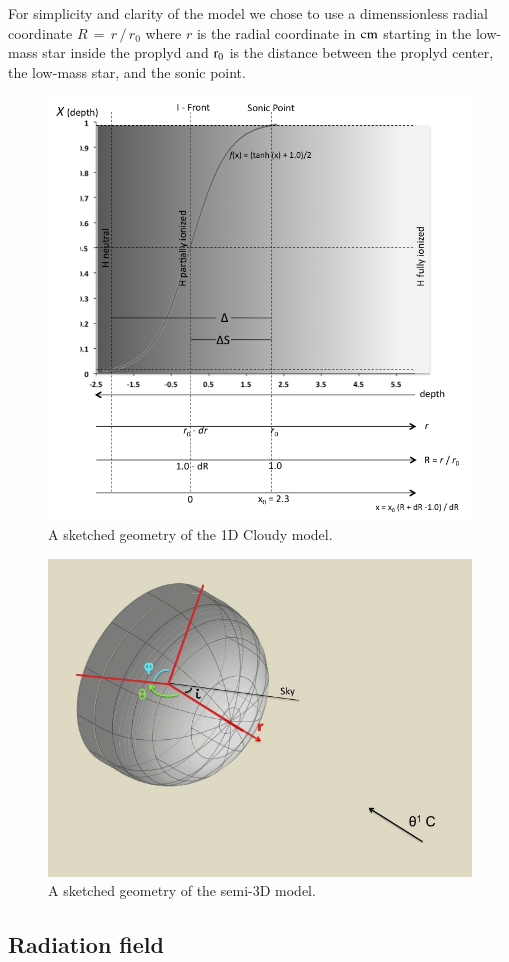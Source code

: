 \documentclass[useAMS,usenatbib]{mn2e}
\begin{document}
For simplicity and clarity of the model we chose to use a dimenssionless radial coordinate $R \,=\, r\,/\,r_0$ where $r$ is the radial coordinate in $\rm cm$ starting in the low-mass star inside the proplyd and $\rm r_0$ is the distance between the proplyd center, the low-mass star, and the sonic point.

\begin{figure}
\centering
  \includegraphics[width=8.5 cm]{./IFront/ifront.png}
  \caption{A sketched geometry of the 1D Cloudy model.} \label{fig:1Dgeom}
\end{figure}

\begin{figure}
  \centering
  \includegraphics[width=8.5 cm]{./graf_model_3D/geometry_model.jpg}
  \caption{A sketched geometry of the semi-3D model.} \label{fig:3Dgeom}
\end{figure}

\subsection{Radiation field}
\label{sec:radiation}
\end{document}
